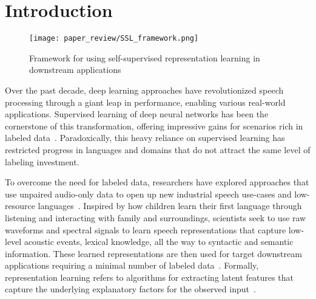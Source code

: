 

\section{Introduction}

\begin{figure}
    \centering
    \texttt{[image: paper\_review/SSL\_framework.png]}
	 \caption{Framework for using self-supervised representation learning in
	 downstream applications}
    \label{fig:SSL_framework}
\end{figure}


Over the past decade, deep learning approaches have revolutionized speech processing
through a giant leap in performance, enabling various real-world applications.
Supervised learning of deep neural networks has been the cornerstone of this
transformation, offering impressive gains for scenarios rich in labeled
data~\cite{lecun_deep_2015,hinton_deep_2012,bourlard_connectionist_1994}. 
Paradoxically, this heavy reliance on supervised learning has restricted progress in
languages and domains that do not attract the same level of labeling
investment. 

To overcome the need for labeled data, researchers have explored approaches that use
unpaired audio-only data to open up new industrial speech use-cases and
low-resource languages~\cite{kemp_unsupervised_1999, lamel_lightly_2002, ma_unsupervised_2006}. Inspired by how
children learn their first language through listening and interacting with
family and surroundings, scientists seek to use raw waveforms and
spectral signals to learn speech representations that capture low-level
acoustic events, lexical knowledge, all the way to syntactic and semantic
information. These learned representations are then used for target downstream
applications requiring a minimal number of labeled data~\cite{hinton_learning_2007,
lecun_tutorial_2006, bengio_representation_2013}. 
Formally, representation learning refers to algorithms for extracting latent
features that capture the underlying explanatory factors for the observed
input~\cite{bengio_representation_2013}. 


